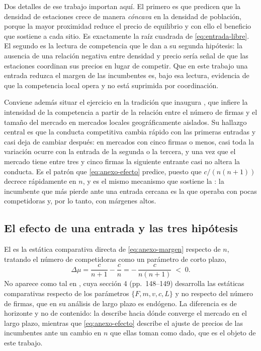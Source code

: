 Dos detalles de ese trabajo importan aquí. El primero es que predicen que la
densidad de estaciones crece de manera \emph{cóncava} en la densidad de
población, porque la mayor proximidad reduce el precio de equilibrio y con ello
el beneficio que sostiene a cada sitio. Es exactamente la raíz cuadrada de
\eqref{eq:entrada-libre}. El segundo es la lectura de competencia que le dan a su
segunda hipótesis: la ausencia de una relación negativa entre densidad y precio
sería señal de que las estaciones coordinan sus precios en lugar de competir. Que
en este trabajo una entrada reduzca el margen de las incumbentes es, bajo esa
lectura, evidencia de que la competencia local opera y no está suprimida por
coordinación.

Conviene además situar el ejercicio en la tradición que inaugura
\textcite{BRESNAHAN1991}, que infiere la intensidad de la competencia a partir de
la relación entre el número de firmas y el tamaño del mercado en mercados locales
geográficamente aislados. Su hallazgo central es que la conducta competitiva
cambia rápido con las primeras entradas y casi deja de cambiar después: en
mercados con cinco firmas o menos, casi toda la variación ocurre con la entrada
de la segunda o la tercera, y una vez que el mercado tiene entre tres y cinco
firmas la siguiente entrante casi no altera la conducta. Es el patrón que
\eqref{eq:anexo-efecto} predice, puesto que $c/(n(n+1))$ decrece rápidamente en
$n$, y es el mismo mecanismo que sostiene la : la incumbente que
más pierde ante una entrada cercana es la que operaba con pocas competidoras y,
por lo tanto, con márgenes altos.

\subsection{El efecto de una entrada y las tres hipótesis}

El  es la estática comparativa directa de
\eqref{eq:anexo-margen} respecto de $n$, tratando el número de competidoras como
un parámetro de corto plazo,
\begin{equation}
    \Delta\mu = \frac{c}{n+1} - \frac{c}{n} = -\,\frac{c}{n(n+1)} \;<\; 0 .
    \label{eq:anexo-efecto}
\end{equation}
No aparece como tal en \textcite{SALOP1979}, cuya sección 4 (pp.~148--149)
desarrolla las estáticas comparativas respecto de los parámetros
$\{F, m, v, c, L\}$ y no respecto del número de firmas, que en su análisis de
largo plazo es endógeno. La diferencia es de horizonte y no de contenido: la
 describe hacia dónde converge el mercado en el largo plazo,
mientras que \eqref{eq:anexo-efecto} describe el ajuste de precios de las
incumbentes ante un cambio en $n$ que ellas toman como dado, que es el objeto de
este trabajo.

